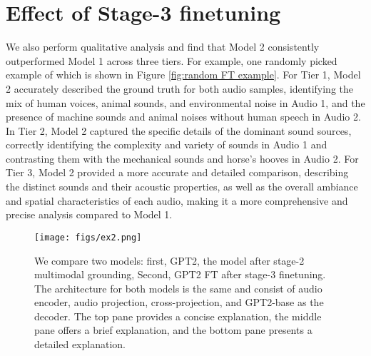 \section{Effect of Stage-3 finetuning} \label{appendix: stage 3 finetune} \vspace{-0.1in}
We also perform qualitative analysis and find that Model 2 consistently outperformed Model 1 across three tiers. For example, one randomly picked example of which is shown in Figure \ref{fig:random FT example}. For Tier 1, Model 2 accurately described the ground truth for both audio samples, identifying the mix of human voices, animal sounds, and environmental noise in Audio 1, and the presence of machine sounds and animal noises without human speech in Audio 2. In Tier 2, Model 2 captured the specific details of the dominant sound sources, correctly identifying the complexity and variety of sounds in Audio 1 and contrasting them with the mechanical sounds and horse's hooves in Audio 2. For Tier 3, Model 2 provided a more accurate and detailed comparison, describing the distinct sounds and their acoustic properties, as well as the overall ambiance and spatial characteristics of each audio, making it a more comprehensive and precise analysis compared to Model 1.

\begin{figure*}[ht]
   \centering
     \texttt{[image: figs/ex2.png]}
     \caption{\small We compare two models: first, GPT2, the model after stage-2 multimodal grounding, Second, GPT2 FT after stage-3 finetuning. The architecture for both models is the same and consist of audio encoder, audio projection, cross-projection, and GPT2-base as the decoder. The top pane provides a concise explanation, the middle pane offers a brief explanation, and the bottom pane presents a detailed explanation.
     }
     \label{fig:appendix 3ft}
\end{figure*}


